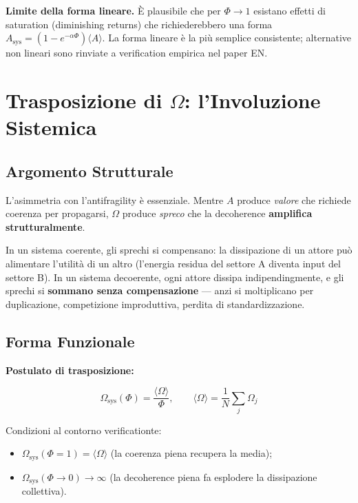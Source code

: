\Conj{} \textbf{Limite della forma lineare.} È plausibile che per
\(\Phi \to 1\) esistano effetti di saturation (diminishing returns)
che richiederebbero una forma
\(A_{\text{sys}} = (1 - e^{-\alpha\Phi})\langle A \rangle\). La forma
lineare è la più semplice consistente; alternative non lineari sono
rinviate a verification empirica nel paper EN.



\section{Trasposizione di $\Omega$: l'Involuzione
Sistemica}\label{trasposizione-di-ux3c9-linvolution-sistemica}

\subsection{Argomento Strutturale}\label{argomento-structural-1}

L'asimmetria con l'antifragility è essenziale. Mentre \(A\) produce
\emph{valore} che richiede coerenza per propagarsi, \(\Omega\) produce
\emph{spreco} che la decoherence \textbf{amplifica strutturalmente}.

In un sistema coerente, gli sprechi si compensano: la dissipazione di un
attore può alimentare l'utilità di un altro (l'energia residua del
settore A diventa input del settore B). In un sistema decoerente, ogni
attore dissipa indipendingmente, e gli sprechi si \textbf{sommano senza
compensazione} --- anzi si moltiplicano per duplicazione, competizione
improduttiva, perdita di standardizzazione.

\subsection{Forma Funzionale}\label{forma-funzionale-1}

\Hypoth{} \textbf{Postulato di trasposizione:}

\[
\Omega_{\text{sys}}(\Phi) = \frac{\langle \Omega \rangle}{\Phi}, \qquad \langle \Omega \rangle = \frac{1}{N}\sum_j \Omega_j
\]

Condizioni al contorno verificationte:

\begin{itemize}
\tightlist
\item
  \(\Omega_{\text{sys}}(\Phi = 1) = \langle \Omega \rangle\) (la
  coerenza piena recupera la media);
\item
  \(\Omega_{\text{sys}}(\Phi \to 0) \to \infty\) (la decoherence piena fa
  esplodere la dissipazione collettiva).
\end{itemize}


